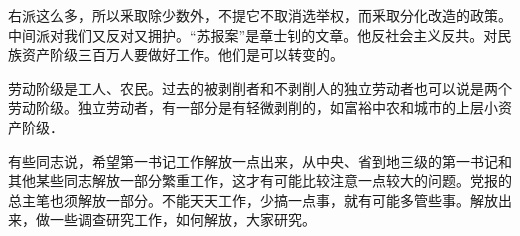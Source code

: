 右派这么多，所以釆取除少数外，不提它不取消选举权，而釆取分化改造的政策。中间派对我们又反对又拥护。“苏报案”是章士钊的文章。他反社会主义反共。对民族资产阶级三百万人要做好工作。他们是可以转变的。

劳动阶级是工人、农民。过去的被剥削者和不剥削人的独立劳动者也可以说是两个劳动阶级。独立劳动者，有一部分是有轻微剥削的，如富裕中农和城市的上层小资产阶级．

有些同志说，希望第一书记工作解放一点出来，从中央、省到地三级的第一书记和其他某些同志解放一部分繁重工作，这才有可能比较注意一点较大的问题。党报的总主笔也须解放一部分。不能天天工作，少搞一点事，就有可能多管些事。解放出来，做一些调查研究工作，如何解放，大家研究。


